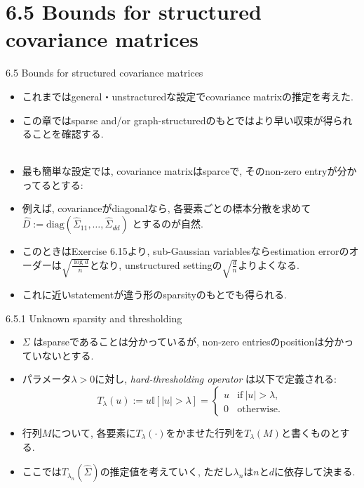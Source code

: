 \documentclass[unicode,aspectratio=169,11pt]{beamer}
\newcommand{\bb}{\mathbb}
\begin{document}
\section{6.5 Bounds for structured covariance matrices}
\begin{frame}{6.5 Bounds for structured covariance matrices}{}
  \begin{itemize}
    \item これまではgeneral・unstracturedな設定でcovariance matrixの推定を考えた.
    \item この章ではsparse and/or graph-structuredのもとではより早い収束が得られることを確認する.\\
          　
    \item 最も簡単な設定では, covariance matrixはsparceで, そのnon-zero entryが分かってるとする:
    \item 例えば, covarianceがdiagonalなら,
      各要素ごとの標本分散を求めて$\widehat{D}:=\mathrm{diag}(\widehat{\Sigma}_{11}, \dots, \widehat{\Sigma}_{dd})$
      とするのが自然.
    \item このときはExercise 6.15より, sub-Gaussian variablesならestimation errorのオーダーは$\sqrt{\frac{\log d}{n}}$となり, unstructured settingの$\sqrt{\frac{d}{n}}$よりよくなる.
    \item これに近いstatementが違う形のsparsityのもとでも得られる.
  \end{itemize}
\end{frame}

\begin{frame}{6.5.1 Unknown sparsity and thresholding}{}
  \begin{itemize}
    \item $\Sigma$ はsparseであることは分かっているが, non-zero entriesのpositionは分かっていないとする.
    \item パラメータ$\lambda > 0$に対し, {\it hard-thresholding operator} は以下で定義される:
          \[
            T_\lambda(u) := u \bb{I}[|u| > \lambda]
            = \begin{cases}
                u & \mathrm{if}\ |u| > \lambda,\\
                0 & \mathrm{otherwise}.
              \end{cases}
              \tag{6.52}
          \]
    \item 行列$M$について, 各要素に$T_\lambda(\cdot)$をかませた行列を$T_\lambda(M)$と書くものとする.
    \item ここでは$T_{\lambda_n}(\widehat{\Sigma})$の推定値を考えていく, ただし$\lambda_n$は$n$と$d$に依存して決まる.
  \end{itemize}
\end{frame}
\end{document}
